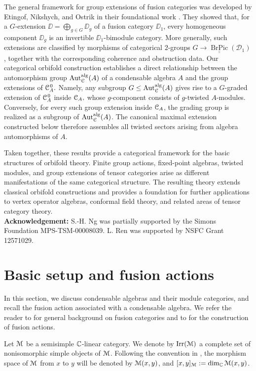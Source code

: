 \documentclass{amsart}
\begin{document}
The general framework for group extensions of fusion categories was developed by Etingof, Nikshych, and Ostrik in their foundational work \cite{ENO2010}.
They showed that, for a $G$-extension $\DD=\bigoplus_{g\in G}\DD_g$ of a fusion category $\DD_1$, every homogeneous component $\DD_g$ is an invertible $\DD_1$-bimodule category. More generally, such extensions are classified  by morphisms of categorical $2$-groups $G\to\underline{\underline{\operatorname{BrPic}}}(\mathcal D_1)$, together with the corresponding coherence and obstruction data. Our categorical orbifold construction establishes a direct relationship
between the automorphism group ${\operatorname{Aut}_{\EuScript{C}}^{\operatorname{alg}}}(A)$ of a condensable algebra $A$ 
and the group extensions of ${{\EuScript{C}}_A^{\hspace{1pt}0}}.$ Namely,  any subgroup $G\leq{\operatorname{Aut}_{\EuScript{C}}^{\operatorname{alg}}}(A)$ gives rise to a $G$-graded extension of ${{\EuScript{C}}_A^{\hspace{1pt}0}}$ inside ${{\EuScript{C}}_A},$
whose $g$-component consists of $g$-twisted $A$-modules. Conversely, for 
every such  group extension inside ${{\EuScript{C}}_A}$, the grading group is realized as a subgroup of ${\operatorname{Aut}_{\EuScript{C}}^{\operatorname{alg}}}(A)$. The canonical maximal extension constructed below therefore assembles all twisted sectors arising from algebra automorphisms of $A$.

Taken together, these results provide a categorical framework for the basic structures of orbifold theory. Finite group actions, fixed-point algebras, twisted modules, and group extensions of tensor categories arise as different manifestations of the same categorical structure. The resulting theory extends classical orbifold constructions and provides a foundation for further applications to vertex operator algebras, conformal field theory, and related areas of tensor category theory.\\

{\bf Acknowledgement:}  S.-H. Ng was partially supported by the Simons Foundation MPS-TSM-00008039. L. Ren was supported by NSFC Grant 12571029.



\section{Basic setup and fusion actions}

In this section, we discuss condensable algebras and their
module categories, and recall the fusion action associated with a
condensable algebra. We refer the reader to \cite{EGNO} for general
background on fusion categories and to \cite{DNRX2025} for the construction
of fusion actions.

Let $\EuScript{M}$ be a semisimple $\mathbb{C}$-linear category. We denote by $\operatorname{Irr}(\EuScript{M})$ a
complete set of nonisomorphic simple objects of $\EuScript{M}$. Following the
convention in \cite{MacLane}, the morphism space of $\EuScript{M}$ from $x$ to $y$
will be denoted by $\EuScript{M}(x,y)$, and $[x,y]_{\EuScript{M}}:=\dim_{\mathbb{C}} \EuScript{M}(x,y)$.
\end{document}

